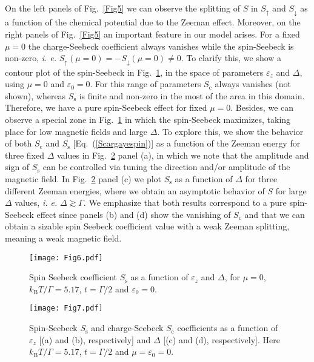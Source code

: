 \documentclass[aps,twocolumn,prb,superscript,floatfix,superscriptaddress,showpacs]{revtex4-1}
\newcommand{\ve}{\varepsilon}
\begin{document}
On the left panels of Fig.\ \ref{Fig5} we can observe the splitting of $S$ in $S_{\uparrow}$ and $S_{\downarrow}$ as a function of the chemical potential due to the Zeeman effect. Moreover, on the right panels of Fig.\ \ref{Fig5} an important feature in our model arises. For a fixed $\mu=0$ the charge-Seebeck coefficient always vanishes while the spin-Seebeck is non-zero, \emph{i. e.} $S_{\uparrow}(\mu=0)=-S_{\downarrow}(\mu=0)\neq0$. To clarify this, we show a contour plot of the spin-Seebeck in Fig.\ \ref{Fig6}, in the space of parameters $\ve_{z}$ and $\Delta$, using $\mu=0$ and $\ve_{0}=0$. For this range of parameters $S_{\text{c}}$ always vanishes (not shown), whereas $S_{\text{s}}$ is finite and non-zero in the most of the area in this domain. Therefore, we have a pure spin-Seebeck effect for fixed $\mu=0$. Besides, we can observe a special zone in Fig.\ \ref{Fig6} in which the spin-Seebeck maximizes, taking place for low magnetic fields and large $\Delta$. To explore this, we show the behavior of both $S_{\text{c}}$ and $S_{\text{s}}$ [Eq.\ (\ref{Scargayespin})] as a function of the Zeeman energy for three fixed $\Delta$ values in Fig.\ \ref{Fig7} panel (a), in which we note that the amplitude and sign of $S_{\text{s}}$ can be controlled via tuning the direction and/or amplitude of the magnetic field. In Fig.\ \ref{Fig7} panel (c) we plot $S_{\text{s}}$ as a function of $\Delta$ for three different Zeeman energies, where we obtain an asymptotic behavior of $S$ for large $\Delta$ values, \emph{i. e.} $\Delta\gtrsim\Gamma$. We emphasize that both results correspond to a pure spin-Seebeck effect since panels (b) and (d) show the vanishing of $S_{\text{c}}$ and that we can obtain a sizable spin Seebeck coefficient value with a weak Zeeman splitting, meaning a weak magnetic field.

\begin{figure}[tbph]
\centering
\texttt{[image: Fig6.pdf]}
\caption{Spin Seebeck coefficient $S_{\text{s}}$ as a function of $\ve_{z}$ and $\Delta$, for $\mu=0$, $k_{\text{B}}T/\Gamma=5.17$, $t=\Gamma/2$ and $\ve_{0}=0$.}
\label{Fig6}
\end{figure}

\begin{figure}[tbph]
\centering
\texttt{[image: Fig7.pdf]}
\caption{Spin-Seebeck $S_{\text{s}}$ and charge-Seebeck $S_{\text{c}}$ coefficients as a function of $\ve_{z}$ [(a) and (b), respectively] and $\Delta$ [(c) and (d), respectively]. Here $k_{\text{B}}T/\Gamma=5.17$, $t=\Gamma/2$ and $\mu=\ve_0=0$.}
\label{Fig7}
\end{figure}
\end{document}
